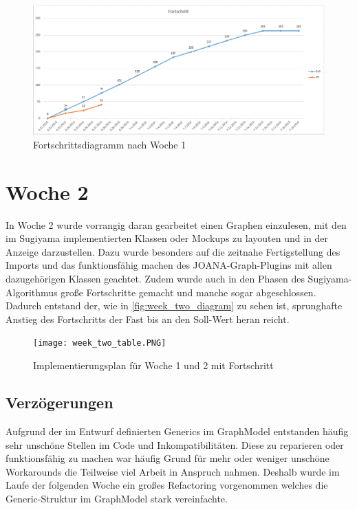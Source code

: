 \begin{figure}[!htbp]
	\centering
	\includegraphics[width=380pt]{resourcen/week_one_diagram.PNG}
	\caption{Fortschrittsdiagramm nach Woche 1}
	\label{fig:week_one_diagram}
\end{figure}
\newpage

\section{Woche 2}
In Woche 2 wurde vorrangig daran gearbeitet einen Graphen einzulesen, mit den im Sugiyama implementierten Klassen oder Mockups zu layouten und in der Anzeige darzustellen. Dazu wurde besonders auf die zeitnahe Fertigstellung des Imports und das funktionsfähig machen des JOANA-Graph-Plugins mit allen dazugehörigen Klassen geachtet. Zudem wurde auch in den Phasen des Sugiyama-Algorithmus große Fortschritte gemacht und manche sogar abgeschlossen. Dadurch entstand der, wie in \ref{fig:week_two_diagram} zu sehen ist, sprunghafte Anstieg des Fortschritts der Fast bis an den Soll-Wert heran reicht. 
\begin{figure}[!htbp]
	\centering
	\texttt{[image: week\_two\_table.PNG]}
	\caption{Implementierungsplan für Woche 1 und 2 mit Fortschritt}
	\label{fig:week_two_table}
\end{figure}
\subsection{Verzögerungen}
Aufgrund der im Entwurf definierten Generics im GraphModel entstanden häufig sehr unschöne Stellen im Code und Inkompatibilitäten. Diese zu reparieren oder funktionsfähig zu machen war häufig Grund für mehr oder weniger unschöne Workarounds die Teilweise viel Arbeit in Anspruch nahmen. Deshalb wurde im Laufe der folgenden Woche ein großes Refactoring vorgenommen welches die Generic-Struktur im GraphModel stark vereinfachte.

